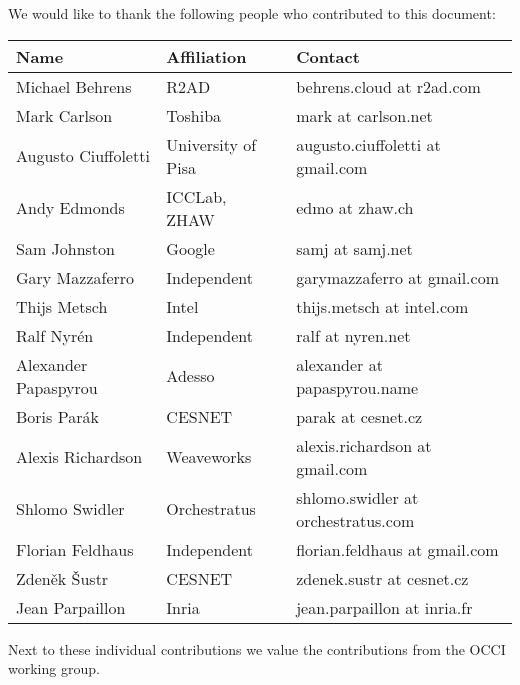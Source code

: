 
We would like to thank the following people who contributed to this
document:

\begin{tabular}{l|p{2in}|p{2in}}
Name & Affiliation & Contact \\
\hline
Michael Behrens & R2AD & behrens.cloud at r2ad.com \\
Mark Carlson & Toshiba & mark at carlson.net \\
Augusto Ciuffoletti & University of Pisa & augusto.ciuffoletti at gmail.com\\
Andy Edmonds & ICCLab, ZHAW & edmo at zhaw.ch \\
Sam Johnston & Google & samj at samj.net \\
Gary Mazzaferro & Independent &  garymazzaferro at gmail.com \\
Thijs Metsch & Intel & thijs.metsch at intel.com \\
Ralf Nyrén & Independent & ralf at nyren.net \\
Alexander Papaspyrou & Adesso & alexander at papaspyrou.name \\
Boris Parák & CESNET & parak at cesnet.cz \\
Alexis Richardson & Weaveworks & alexis.richardson at gmail.com \\
Shlomo Swidler & Orchestratus & shlomo.swidler at orchestratus.com \\
Florian Feldhaus & Independent & florian.feldhaus at gmail.com \\
Zden\v{e}k \v{S}ustr & CESNET & zdenek.sustr at cesnet.cz \\
Jean Parpaillon & Inria & jean.parpaillon at inria.fr \\
\end{tabular}

Next to these individual contributions we value the contributions from
the OCCI working group.
